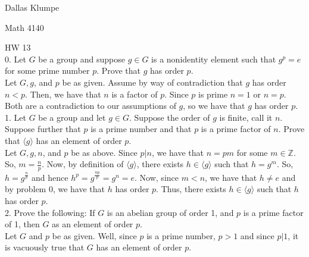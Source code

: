 \documentclass[12pt]{article}
\begin{document}
\noindent Dallas Klumpe

\noindent Math 4140

\noindent HW 13\\

0. Let $G$ be a group and suppose $g\in G$ is a nonidentity element such that $g^p=e$ for some prime number $p$. Prove that $g$ has order $p$.\\
Let $G, g$, and $p$ be as given. Assume by way of contradiction that $g$ has order $n<p$. Then, we have that $n$ is a factor of $p$. Since $p$ is prime $n=1$ or $n=p$. Both are a contradiction to our assumptions of $g$, so we have that $g$ has order $p$.\\[20pt]

1. Let $G$ be a group and let $g\in G$. Suppose the order of $g$ is finite, call it $n$. Suppose further that $p$ is a prime number and that $p$ is a prime factor of $n$. Prove that $\langle g\rangle$ has an element of order $p$.\\
Let $G, g, n$, and $p$ be as above. Since $p|n$, we have that $n=pm$ for some $m\in\mathbb{Z}$. So, $m=\frac{n}{p}$. Now, by definition of $\langle g\rangle$, there exists $h\in\langle g\rangle$ such that $h=g^m$. So, $h=g^{\frac{n}{p}}$ and hence $h^p=g^{\frac{np}{p}}=g^n=e$. Now, since $m<n$, we have that $h\neq e$ and by problem 0, we have that $h$ has order $p$. Thus, there exists $h\in\langle g\rangle$ such that $h$ has order $p$.\\[20pt]

2. Prove the following: If $G$ is an abelian group of order 1, and $p$ is a prime factor of 1, then $G$ as an element of order $p$.\\
Let $G$ and $p$ be as given. Well, since $p$ is a prime number, $p>1$ and since $p|1$, it is vacuously true that $G$ has an element of order $p$.\\
\end{document}
